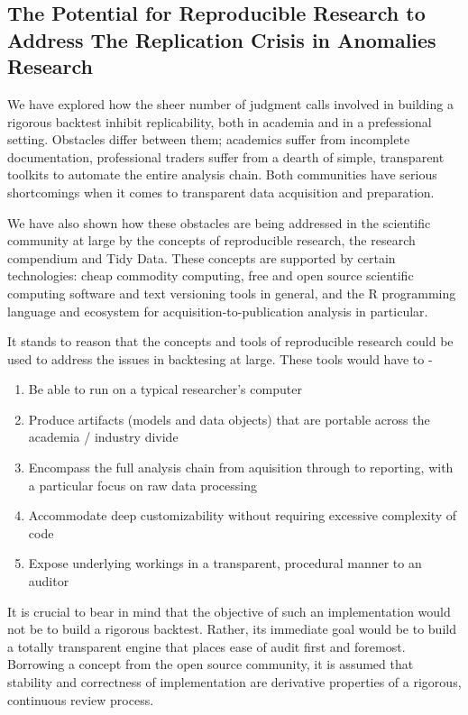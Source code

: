 \documentclass[11pt,preprint, authoryear]{elsarticle}
\numberwithin{equation}{section}
\numberwithin{figure}{section}
\numberwithin{table}{section}
\def\tightlist{} %
\begin{document}
\subsection{The Potential for Reproducible Research to Address The
Replication Crisis in Anomalies
Research}\label{the-potential-for-reproducible-research-to-address-the-replication-crisis-in-anomalies-research}

We have explored how the sheer number of judgment calls involved in
building a rigorous backtest inhibit replicability, both in academia and
in a prefessional setting. Obstacles differ between them; academics
suffer from incomplete documentation, professional traders suffer from a
dearth of simple, transparent toolkits to automate the entire analysis
chain. Both communities have serious shortcomings when it comes to
transparent data acquisition and preparation.

We have also shown how these obstacles are being addressed in the
scientific community at large by the concepts of reproducible research,
the research compendium and Tidy Data. These concepts are supported by
certain technologies: cheap commodity computing, free and open source
scientific computing software and text versioning tools in general, and
the R programming language and ecosystem for acquisition-to-publication
analysis in particular.

It stands to reason that the concepts and tools of reproducible research
could be used to address the issues in backtesing at large. These tools
would have to -

\begin{enumerate}
\def\labelenumi{\arabic{enumi}.}
\setcounter{enumi}{3}
\tightlist
\item
  Be able to run on a typical researcher's computer
\item
  Produce artifacts (models and data objects) that are portable across
  the academia / industry divide
\item
  Encompass the full analysis chain from aquisition through to
  reporting, with a particular focus on raw data processing
\item
  Accommodate deep customizability without requiring excessive
  complexity of code
\item
  Expose underlying workings in a transparent, procedural manner to an
  auditor
\end{enumerate}

It is crucial to bear in mind that the objective of such an
implementation would not be to build a rigorous backtest. Rather, its
immediate goal would be to build a totally transparent engine that
places ease of audit first and foremost. Borrowing a concept from the
open source community, it is assumed that stability and correctness of
implementation are derivative properties of a rigorous, continuous
review process.
\end{document}
